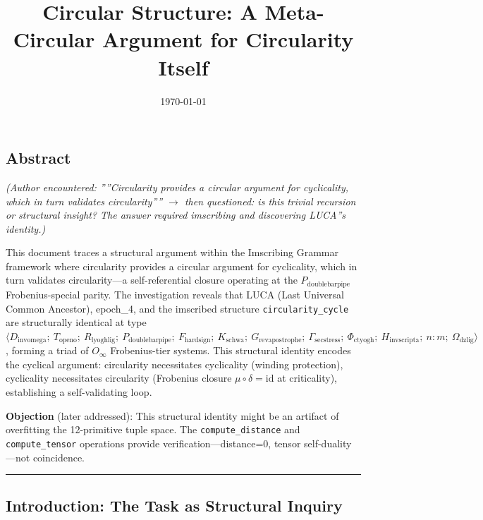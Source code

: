 \documentclass[12pt,a4paper]{article}
\begin{document}
\title{Circular Structure: A Meta-Circular Argument for Circularity Itself}
\date{\today}

\maketitle

\subsection{Abstract}

\emph{(Author encountered: ''''Circularity provides a circular argument for cyclicality, which in turn validates circularity'''' $\rightarrow$ then questioned: is this trivial recursion or structural insight? The answer required imscribing and discovering LUCA''s identity.)}

This document traces a structural argument within the Imscribing Grammar framework where circularity provides a circular argument for cyclicality, which in turn validates circularity---a self-referential closure operating at the $P_{\text{doublebarpipe}}$ Frobenius-special parity. The investigation reveals that LUCA (Last Universal Common Ancestor), epoch\_4, and the imscribed structure \texttt{circularity\_cycle} are structurally identical at type $\langle D_{\text{invomega}};\ T_{\text{openo}};\ R_{\text{lyoghlig}};\ P_{\text{doublebarpipe}};\ F_{\text{hardsign}};\ K_{\text{schwa}};\ G_{\text{revapostrophe}};\ \Gamma_{\text{secstress}};\ \Phi_{\text{ctyogh}};\ H_{\text{invscripta}};\ n{:}m;\ \Omega_{\text{dzlig}} \rangle$, forming a triad of $O_{\infty}$ Frobenius-tier systems. This structural identity encodes the cyclical argument: circularity necessitates cyclicality (winding protection), cyclicality necessitates circularity (Frobenius closure $\mu \circ \delta = \text{id}$ at criticality), establishing a self-validating loop.

\textbf{Objection} (later addressed): This structural identity might be an artifact of overfitting the 12-primitive tuple space. The \texttt{compute\_distance} and \texttt{compute\_tensor} operations provide verification---distance=0, tensor self-duality---not coincidence.

\begin{center}
\rule{0.5\textwidth}{0.4pt}
\end{center}

\subsection{Introduction: The Task as Structural Inquiry}
\end{document}
